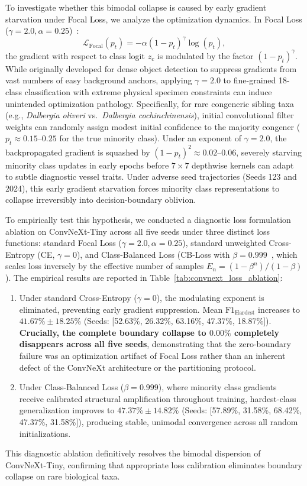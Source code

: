 \documentclass[a4paper,fleqn]{cas-sc}
\begin{document}
To investigate whether this bimodal collapse is caused by early gradient starvation under Focal Loss, we analyze the optimization dynamics. In Focal Loss ($\gamma=2.0, \alpha=0.25$)~\cite{focal}:
\begin{equation}
\mathcal{L}_{\text{Focal}}(p_t) = -\alpha (1 - p_t)^\gamma \log(p_t),
\end{equation}
the gradient with respect to class logit $z_c$ is modulated by the factor $(1 - p_t)^\gamma$. While originally developed for dense object detection to suppress gradients from vast numbers of easy background anchors, applying $\gamma=2.0$ to fine-grained 18-class classification with extreme physical specimen constraints can induce unintended optimization pathology. Specifically, for rare congeneric sibling taxa (e.g., \textit{Dalbergia oliveri} vs.\ \textit{Dalbergia cochinchinensis}), initial convolutional filter weights can randomly assign modest initial confidence to the majority congener ($p_t \approx 0.15$--$0.25$ for the true minority class). Under an exponent of $\gamma=2.0$, the backpropagated gradient is squashed by $(1 - p_t)^2 \approx 0.02$--$0.06$, severely starving minority class updates in early epochs before $7 \times 7$ depthwise kernels can adapt to subtle diagnostic vessel traits. Under adverse seed trajectories (Seeds 123 and 2024), this early gradient starvation forces minority class representations to collapse irreversibly into decision-boundary oblivion.

To empirically test this hypothesis, we conducted a diagnostic loss formulation ablation on ConvNeXt-Tiny across all five seeds under three distinct loss functions: standard Focal Loss ($\gamma=2.0, \alpha=0.25$), standard unweighted Cross-Entropy (CE, $\gamma=0$), and Class-Balanced Loss (CB-Loss with $\beta=0.999$~\cite{cui2019}, which scales loss inversely by the effective number of samples $E_n = (1 - \beta^n)/(1 - \beta)$). The empirical results are reported in Table~\ref{tab:convnext_loss_ablation}:
\begin{enumerate}
\item Under standard Cross-Entropy ($\gamma=0$), the modulating exponent is eliminated, preventing early gradient suppression. Mean $\mathrm{F1}_{\text{Hardest}}$ increases to $41.67\% \pm 18.25\%$ (Seeds: [52.63\%, 26.32\%, 63.16\%, 47.37\%, 18.87\%]). \textbf{Crucially, the complete boundary collapse to $0.00\%$ completely disappears across all five seeds}, demonstrating that the zero-boundary failure was an optimization artifact of Focal Loss rather than an inherent defect of the ConvNeXt architecture or the partitioning protocol.
\item Under Class-Balanced Loss ($\beta=0.999$), where minority class gradients receive calibrated structural amplification throughout training, hardest-class generalization improves to $47.37\% \pm 14.82\%$ (Seeds: [57.89\%, 31.58\%, 68.42\%, 47.37\%, 31.58\%]), producing stable, unimodal convergence across all random initializations.
\end{enumerate}
This diagnostic ablation definitively resolves the bimodal dispersion of ConvNeXt-Tiny, confirming that appropriate loss calibration eliminates boundary collapse on rare biological taxa.
\end{document}
